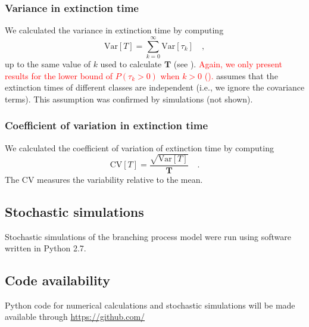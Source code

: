 \documentclass[9pt,lineno]{elife}
\newcommand{\red}{\textcolor{red}}
\begin{document}
\subsubsection{Variance in extinction time}

We calculated the variance in extinction time by computing 
%
\begin{equation}
    \mathrm{Var}[T] = \sum_{k=0}^\infty \mathrm{Var}[\tau_k] \quad ,
    \label{eq:varT}
\end{equation}
%
up to the same value of $k$ used to calculate $\mathbf{T}$ (see ).  
\red{Again, we only present results for the lower bound of $P(\tau_{k} > 0)$ when $k>0$ ().}
 assumes that the extinction times of different classes are independent (i.e., we ignore the covariance terms).  
This assumption was confirmed by simulations (not shown).

\subsubsection{Coefficient of variation in extinction time}

We calculated the coefficient of variation of extinction time by computing 
%
\begin{equation}
    \mathrm{CV}[T] = \frac{\sqrt{\mathrm{Var}[T]}}{\mathbf{T}} \quad . 
    \label{eq:CV}
\end{equation}
%
The CV measures the variability relative to the mean.


\subsection{Stochastic simulations}


Stochastic simulations of the branching process model were run using software written in Python 2.7.


\subsection{Code availability}


Python code for numerical calculations and stochastic simulations will be made available through \url{https://github.com/}



\end{document}
